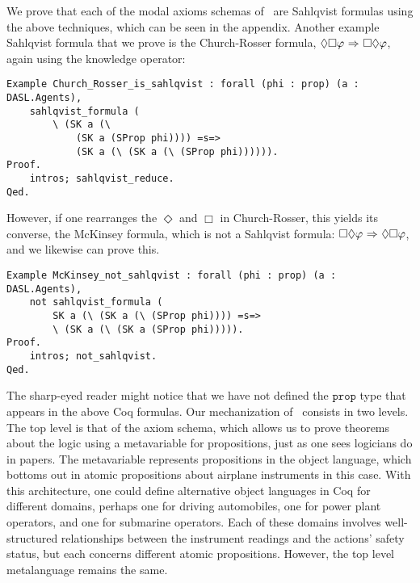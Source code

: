 We prove that each of the modal axioms schemas of \DASL\ are Sahlqvist formulas using the above techniques, which can be seen in the appendix. Another example Sahlqvist formula that we prove is the Church-Rosser formula, $\Diamond\Box\varphi {\ \Rightarrow \ } \Box\Diamond\varphi$, again using the knowledge operator:

\begin{tcolorbox}
	\begin{lstlisting}[language=Coq]
Example Church_Rosser_is_sahlqvist : forall (phi : prop) (a : DASL.Agents),
	sahlqvist_formula (
		\ (SK a (\ 
			(SK a (SProp phi)))) =s=> 
			(SK a (\ (SK a (\ (SProp phi)))))).
Proof.
	intros; sahlqvist_reduce.
Qed.
	\end{lstlisting}
\end{tcolorbox}

However, if one rearranges the $\Diamond$ and $\Box$ in Church-Rosser, this yields its converse, the McKinsey formula, which is not a Sahlqvist formula: $\Box\Diamond\varphi {\ \Rightarrow \ } \Diamond \Box \varphi$, and we likewise can prove this.

\begin{tcolorbox}
	\begin{lstlisting}[language=Coq]
Example McKinsey_not_sahlqvist : forall (phi : prop) (a : DASL.Agents),
	not sahlqvist_formula (
		SK a (\ (SK a (\ (SProp phi)))) =s=> 
		\ (SK a (\ (SK a (SProp phi))))).
Proof.
	intros; not_sahlqvist.  
Qed.
	\end{lstlisting}
\end{tcolorbox}

The sharp-eyed reader might notice that we have not defined the $\mathtt{prop}$ type that appears in the above Coq formulas. Our mechanization of \DASL\ consists in two levels. The top level is that of the axiom schema, which allows us to prove theorems about the logic using a metavariable for propositions, just as one sees logicians do in papers. The metavariable represents propositions in the object language, which bottoms out in atomic propositions about airplane instruments in this case. With this architecture, one could define alternative object languages in Coq for different domains, perhaps one for driving automobiles, one for power plant operators, and one for submarine operators. Each of these domains involves well-structured relationships between the instrument readings and the actions' safety status, but each concerns different atomic propositions. However, the top level metalanguage remains the same.

